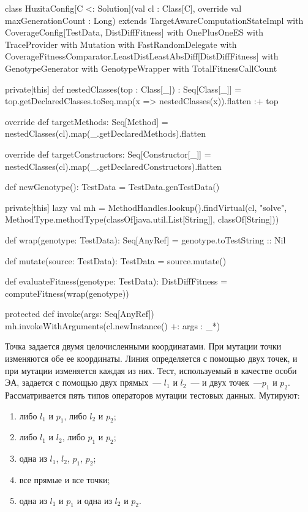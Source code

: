 \begin{snippet}[language=Scala,caption={Конфигурация эволюционного алгоритма для задачи  Huzita Axiom 6},label={lst:huzita_config}]
class HuzitaConfig[C <: Solution](val cl : Class[C], override val maxGenerationCount : Long) 
  extends  TargetAwareComputationStateImpl
  with CoverageConfig[TestData, DistDiffFitness]
  with OnePlusOneES
  with TraceProvider
  with Mutation
  with FastRandomDelegate
  with CoverageFitnessComparator.LeastDistLeastAbsDiff[DistDiffFitness]
  with GenotypeGenerator
  with GenotypeWrapper
  with TotalFitnessCallCount
{
  private[this] def nestedClasses(top : Class[_]) : Seq[Class[_]] = {
    top.getDeclaredClasses.toSeq.map(x => nestedClasses(x)).flatten :+ top
  }

  override def targetMethods: Seq[Method] = nestedClasses(cl).map(_.getDeclaredMethods).flatten

  override def targetConstructors: Seq[Constructor[_]] = nestedClasses(cl).map(_.getDeclaredConstructors).flatten

  def newGenotype(): TestData = TestData.genTestData()

  private[this] lazy val mh =  MethodHandles.lookup().findVirtual(cl, "solve", MethodType.methodType(classOf[java.util.List[String]], classOf[String]))

  def wrap(genotype: TestData): Seq[AnyRef] = genotype.toTestString :: Nil

  def mutate(source: TestData): TestData = source.mutate()

  def evaluateFitness(genotype: TestData): DistDiffFitness = computeFitness(wrap(genotype))

  protected def invoke(args: Seq[AnyRef]) {
    mh.invokeWithArguments(cl.newInstance() +: args : _*)
  } 
} 
\end{snippet}

Точка задается двумя целочисленными координатами. При мутации точки изменяются обе ее координаты. Линия определяется с помощью двух точек, и при мутации 
изменяется каждая из них. Тест, используемый в качестве особи ЭА, задается с помощью двух прямых~--- $l_1$ и $l_2$~--- и двух точек~---$p_1$ и $p_2$. 
Рассматривается пять типов операторов мутации тестовых данных.
Мутируют:
\begin{enumerate}
 \item либо $l_1$ и $p_1$, либо $l_2$ и $p_2$;
 \item либо $l_1$ и $l_2$, либо $p_1$ и $p_2$;
 \item одна из $l_1$, $l_2$, $p_1$, $p_2$;
 \item все прямые и все точки;
 \item одна из $l_1$ и $p_1$ и одна из $l_2$ и $p_2$.
\end{enumerate}

